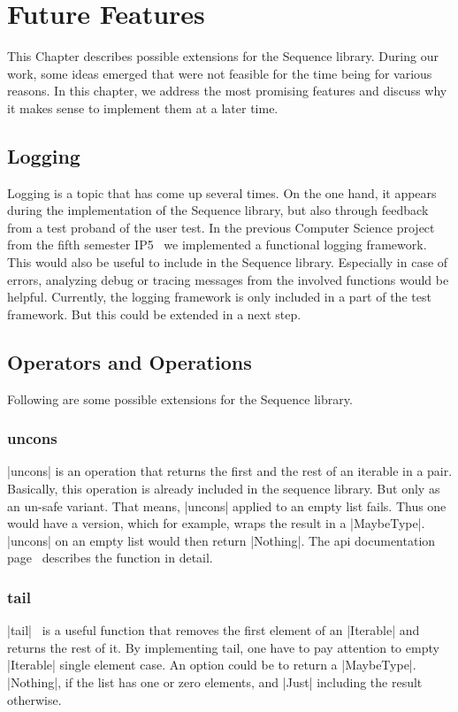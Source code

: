 \section{Future Features}
\label{sec:Future Features}
This Chapter describes possible extensions for the Sequence library. During our
work, some ideas emerged that were not feasible for the time being for various
reasons. In this chapter, we address the most promising features and discuss
why it makes sense to implement them at a later time.

\subsection{Logging}
\label{sub:Logging}
Logging is a topic that has come up several times. On the one hand, it appears
during the implementation of the Sequence library, but also through feedback
from a test proband of the user test. In the previous Computer Science project from the fifth
semester IP5~\cite{wild_ip5_2023} we implemented a functional logging framework. 
This would also be useful to include in the Sequence library. Especially in case of errors, analyzing
debug or tracing messages from the involved functions would be helpful. Currently, the logging
framework is only included in a part of the test framework. But this could be
extended in a next step.

\subsection{Operators and Operations}
\label{sub:Operators and Operations}
Following are some possible extensions for the Sequence library.

\subsubsection{uncons}
\label{subsub:uncons}
|uncons| is an operation that returns the first and the rest of an iterable in a
pair. Basically, this operation is already included in the sequence library.
But only as an un-safe variant. That means, |uncons| applied to an empty list
fails. Thus one would have a version, which for example, wraps the result in a
|MaybeType|. |uncons| on an empty list would then return |Nothing|. The
api documentation page~\cite{hoogle_uncons} describes the function in detail.

\subsubsection{tail}
\label{subsub:tail}
|tail|~\cite{hoogle_tail} is a useful function that removes the first element of an |Iterable|
and returns the rest of it. By implementing tail, one have to pay attention to
empty |Iterable| single element case. An option could be to return a
|MaybeType|. |Nothing|, if the list has one or zero elements, and
|Just| including the result otherwise.

